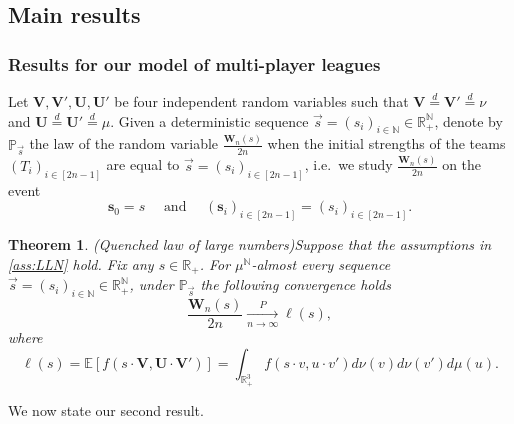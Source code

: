 \documentclass[11pt,a4paper,oneside]{article}
\newtheorem{thm}{Theorem}[section]
\theoremstyle{definition}
\theoremstyle{remark}
\def\N{\mathbb{N}}
\def\E{\mathbb{E}}
\def\P{\mathbb{P}}
\def\R{\mathbb{R}}
\begin{document}
\subsection{Main results}\label{sect:main_results}

\subsubsection{Results for our model of multi-player leagues}

Let $\bm{V},\bm{V'},\bm U, \bm U'$ be four independent random variables such that $\bm{V}\stackrel{d}{=}\bm{V'}\stackrel{d}{=}\nu$ and $\bm U\stackrel{d}{=}\bm U'\stackrel{d}{=}\mu$. Given a deterministic sequence $\vec{s}=(s_i)_{{i\in\N}}\in\R^{\N}_{+}$,  denote by $\P_{\vec{s}}$ the law of the random variable $\frac{\bm W_n(s)}{2n}$ when the initial strengths of the teams $(T_i)_{i\in[2n-1]}$ are equal to $\vec{s}=(s_i)_{{i\in[2n-1]}}$, i.e.\ we study $\frac{\bm W_n(s)}{2n}$ on the event
 $$\bm s_0=s\quad \text{ and }\quad(\bm s_i)_{{i\in[2n-1]}}=(s_i)_{{i\in[2n-1]}}.$$

\begin{thm}(Quenched law of large numbers)\label{thm:LLN}
	 Suppose that the assumptions in \cref{ass:LLN} hold. Fix any $s\in\R_+$. For $\mu^{\N}$-almost every sequence $\vec{s}=(s_i)_{{i\in\N}}\in\R^{\N}_{+}$, under $\P_{\vec{s}}$ the following convergence holds
	\begin{equation}
	\frac{\bm W_n(s)}{2n}\xrightarrow[n\to\infty]{P}\ell(s), 
	\end{equation}
	where 
	\begin{equation}
	\ell(s)=\E\left[f\left(s\cdot\bm{V},\bm U\cdot\bm{V'}\right)\right]=\int_{\R^3_+} f\left(s\cdot v,u\cdot v'\right)d\nu(v)d\nu(v')d\mu(u).
	\end{equation}
\end{thm}


We now state our second result. 
\end{document}
